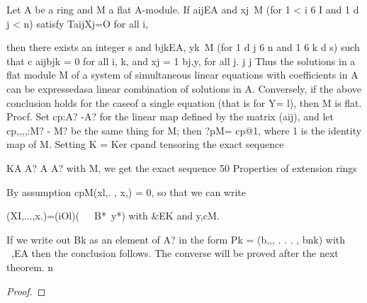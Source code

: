 \begin{theorem}[Theorem 7.6]\label{mcrt-auto-theorem-7-6}\uses{}
\begin{mathematicalrecord}
Let A be a ring and M a flat A-module. If aijEA and xj~M
(for 1 < i 6 I and 1 d j < n) satisfy
        TaijXj=O          for all   i,

then there exists an integer s and bjkEA, yk~M (for 1 d j 6 n and 1 6 k d s)
such that
           c aijbjk = 0 for all i, k, and xj = 1 bj,y, for all j.
            j                                     j
   Thus the solutions in a flat module M of a system of simultaneous linear
equations with coefficients in A can be expressedasa linear combination of
solutions in A. Conversely, if the above conclusion holds for the caseof a
single equation (that is for Y= l), then M is flat.
Procf. Set cp:A? -A?      for the linear map defined by the matrix (aij), and
let cp,,,,:M? - M? be the same thing for M; then ?pM= cp@1, where 1 is
the identity map of M. Setting K = Ker cpand tensoring the exact sequence

KA    A? A         A? with M, we get the exact sequence
50         Properties    of extension rings

By assumption        cpM(xl,.     , x,) = 0, so that we can write

           (XI,...,x.)=(iOl)(~~~B*~y*)              with &EK        and        y,cM.

If we write out Bk as an element of A? in the form Pk = (b,,, . . . , bnk) with
~,EA then the conclusion follows. The converse will be proved after the
next theorem.    n
\end{mathematicalrecord}
\end{theorem}
\begin{proof}
\notready
\end{proof}


